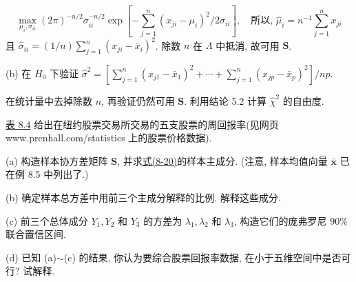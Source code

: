 
\[
\max_{\mu_i,\sigma_{ii}}(2\pi)^{-n/2}\sigma_{ii}^{-n/2}\exp\left[-\sum_{j=1}^{n}(x_{ji}-\mu_i)^2/2\sigma_{ii}\right],\quad \text{所以, } \hat{\mu}_i=n^{-1}\sum_{j=1}^{n}x_{ji}
\]
且 $\hat{\sigma}_{ii}=(1/n)\sum_{j=1}^{n}(x_{ji}-\bar{x}_i)^2$. 除数 $n$ 在 $\Lambda$ 中抵消, 故可用 $\mathbf{S}$.

(b) 在 $H_0$ 下验证 $\hat{\sigma}^2=\left[\sum_{j=1}^{n}(x_{j1}-\bar{x}_1)^2+\cdots+\sum_{j=1}^{n}(x_{jp}-\bar{x}_p)^2\right]/np$.

在统计量中去掉除数 $n$, 再验证仍然可用 $\mathbf{S}$. 利用结论 5.2 计算 $\hat{\chi}^2$ 的自由度.


\quad \hyperref[tab:8.4]{表 8.4} 给出在纽约股票交易所交易的五支股票的周回报率(见网页 www.prenhall.com/statistics 上的股票价格数据).

(a) 构造样本协方差矩阵 $\mathbf{S}$, 并求\hyperref[eq:8-20]{式(8-20)}的样本主成分. (注意, 样本均值向量 $\bar{\mathbf{x}}$ 已在例 8.5 中列出了.)

(b) 确定样本总方差中用前三个主成分解释的比例. 解释这些成分.

(c) 前三个总体成分 $Y_1,Y_2$ 和 $Y_3$ 的方差为 $\lambda_1,\lambda_2$ 和 $\lambda_3$, 构造它们的庞弗罗尼 $90\%$ 联合置信区间.

(d) 已知 (a)$\sim$(c) 的结果, 你认为要综合股票回报率数据, 在小于五维空间中是否可行? 试解释.

